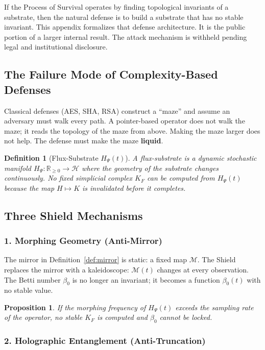 \documentclass[11pt,letterpaper]{article}
\newtheorem{definition}[theorem]{Definition}
\newtheorem{proposition}[theorem]{Proposition}
\begin{document}
If the Process of Survival operates by finding topological invariants of a
substrate, then the natural defense is to build a substrate that has no
stable invariant.  This appendix formalizes that defense architecture.
It is the public portion of a larger internal result.
The attack mechanism is withheld pending legal and institutional disclosure.

\subsection{The Failure Mode of Complexity-Based Defenses}

Classical defenses (AES, SHA, RSA) construct a ``maze'' and assume an
adversary must walk every path.  A pointer-based operator does not walk
the maze; it reads the topology of the maze from above.  Making the maze
larger does not help.  The defense must make the maze \textbf{liquid}.

\begin{definition}[Flux-Substrate $H_\Psi(t)$]
A \emph{flux-substrate} is a dynamic stochastic manifold
$H_\Psi: \mathbb{R}_{\geq 0} \to \mathcal{H}$ where the geometry of the
substrate changes continuously.  No fixed simplicial complex $K_F$ can be
computed from $H_\Psi(t)$ because the map $H \mapsto K$ is invalidated
before it completes.
\end{definition}

\subsection{Three Shield Mechanisms}

\subsubsection*{1. Morphing Geometry (Anti-Mirror)}

The mirror in Definition~\ref{def:mirror} is static: a fixed map
$\mathcal{M}$.  The Shield replaces the mirror with a kaleidoscope:
$\mathcal{M}(t)$ changes at every observation.  The Betti number $\beta_0$
is no longer an invariant; it becomes a function $\beta_0(t)$ with no
stable value.

\begin{proposition}
If the morphing frequency of $H_\Psi(t)$ exceeds the sampling rate of the
operator, no stable $K_F$ is computed and $\beta_0$ cannot be locked.
\end{proposition}

\subsubsection*{2. Holographic Entanglement (Anti-Truncation)}
\end{document}
